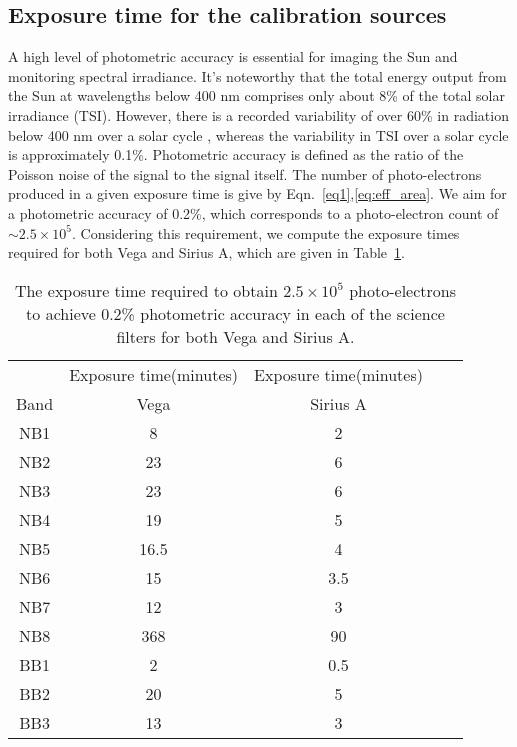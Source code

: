 \subsection{Exposure time for the calibration sources}\label{expo_time}

A high level of photometric accuracy is essential for imaging the Sun and monitoring spectral irradiance. It's noteworthy that the total energy output from the Sun at wavelengths below 400 nm comprises only about 8\% of the total solar irradiance (TSI). However, there is a recorded variability of over 60\% in radiation below 400 nm over a solar cycle \citep{krivova06}, whereas the variability in TSI over a solar cycle is approximately 0.1\%. Photometric accuracy is defined as the ratio of the Poisson noise of the signal to the signal itself. The number of photo-electrons produced in a given exposure time is give by Eqn.~\ref{eq1},\ref{eq:eff_area}. We aim for a photometric accuracy of 0.2\%, which corresponds to a photo-electron count of $\sim 2.5 \times 10^{5}$. Considering this requirement, we compute the exposure times required for both Vega and Sirius A, which are given in Table~\ref{tab_2}.

\begin{table}[ht!]
\centering
\begin{tabular}{ccccc}
\hline
        & Exposure time(minutes) & Exposure time(minutes) \\
        Band & Vega & Sirius A\\
        \hline
        NB1 & 8 & 2\\
        NB2 & 23 & 6\\
        NB3 & 23 & 6\\
        NB4 & 19 & 5\\
        NB5 & 16.5 & 4\\
        NB6 & 15 & 3.5\\
        NB7 & 12 & 3\\
        NB8 & 368 & 90\\
        BB1 & 2 & 0.5\\
        BB2 & 20 & 5\\
        BB3 & 13 & 3\\
        \hline
    \end{tabular}
    \caption{The exposure time required to obtain $2.5 \times 10^{5}$ photo-electrons to achieve 0.2\% photometric accuracy in each of the science filters for both Vega and Sirius A.}
\label{tab_2}
\end{table}


